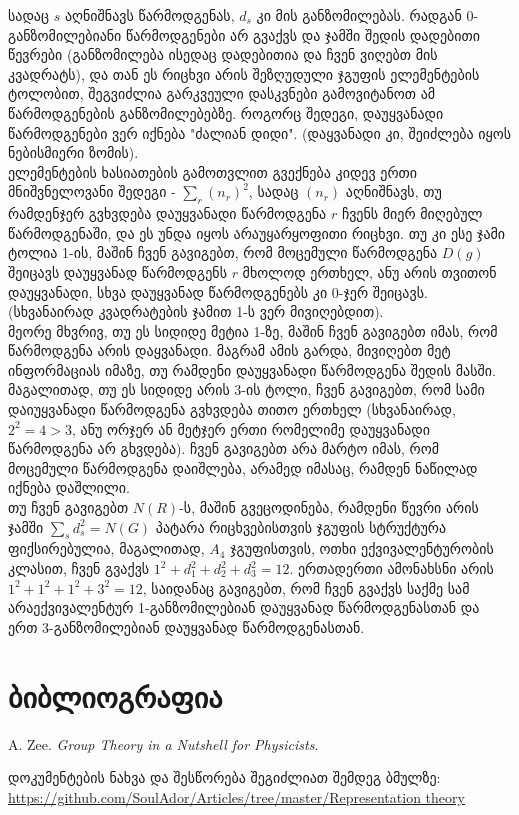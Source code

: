 \documentclass[12pt]{article}
\begin{document}
\begin{sloppypar}
სადაც $s$ აღნიშნავს წარმოდგენას, $d_s$ კი მის განზომილებას. რადგან 0-განზომილებიანი წარმოდგენები არ გვაქვს და ჯამში შედის დადებითი წევრები (განზომილება ისედაც დადებითია და ჩვენ ვიღებთ მის კვადრატს), და თან ეს რიცხვი არის შეზღუდული ჯგუფის ელემენტების ტოლობით, შეგვიძლია გარკვეული დასკვნები გამოვიტანოთ ამ წარმოდგენების განზომილებებზე. როგორც შედეგი, დაუყვანადი წარმოდგენები ვერ იქნება "ძალიან დიდი". (დაყვანადი კი, შეიძლება იყოს ნებისმიერი ზომის).\\

ელემენტების ხასიათების გამოთვლით გვექნება კიდევ ერთი მნიშვნელოვანი შედეგი - 
$ \sum_r (n_r)^2 $, სადაც $(n_r)$ აღნიშნავს, თუ რამდენჯერ გვხვდება დაუყვანადი წარმოდგენა $r$ ჩვენს მიერ მიღებულ წარმოდგენაში, და ეს უნდა იყოს არაუყარყოფითი რიცხვი. თუ კი ესე ჯამი ტოლია 1-ის, მაშინ ჩვენ გავიგებთ, რომ მოცემული წარმოდგენა $D(g)$ შეიცავს დაუყვანად წარმოდგენს $r$ მხოლოდ ერთხელ, ანუ არის თვითონ დაუყვანადი, სხვა დაუყვანად წარმოდგენებს კი 0-ჯერ შეიცავს. (სხვანაირად კვადრატების ჯამით 1-ს ვერ მივიღებდით).\\

მეორე მხვრივ, თუ ეს სიდიდე მეტია 1-ზე, მაშინ ჩვენ გავიგებთ იმას, რომ წარმოდგენა არის დაყვანადი. მაგრამ ამის გარდა, მივიღებთ მეტ ინფორმაციას იმაზე, თუ რამდენი დაუყვანადი წარმოდგენა შედის მასში. მაგალითად, თუ ეს სიდიდე არის 3-ის ტოლი, ჩვენ გავიგებთ, რომ სამი დაიუყვანადი წარმოდგენა გვხვდება თითო ერთხელ (სხვანაირად, $2^2=4>3$, ანუ ორჯერ ან მეტჯერ ერთი რომელიმე დაუყვანადი წარმოდგენა არ გხვდება). ჩვენ გავიგებთ არა მარტო იმას, რომ მოცემული წარმოდგენა დაიშლება, არამედ იმასაც, რამდენ ნაწილად იქნება დაშლილი.\\

თუ ჩვენ გავიგებთ $N(R)$-ს, მაშინ გვეცოდინება, რამდენი წევრი არის ჯამში 
$ \sum_s d^2_s = N(G)$ პატარა რიცხვებისთვის ჯგუფის სტრუქტურა ფიქსირებულია, მაგალითად, $A_4$ ჯგუფისთვის, ოთხი ექვივალენტურობის კლასით, ჩვენ გვაქვს $1^2 + d_1^2 + d_2^2 + d_3^2 = 12$. ერთადერთი ამონახსნი არის $1^2 + 1^2 + 1^2 + 3^2 = 12$, საიდანაც გავიგებთ, რომ ჩვენ გვაქვს საქმე სამ არაექვივალენტურ 1-განზომილებიან დაუყვანად წარმოდგენასთან და ერთ 3-განზომილებიან დაუყვანად წარმოდგენასთან.

\newpage
\section{ბიბლიოგრაფია}
\begin{thebibliography}{9}
A. Zee. 
\textit{Group Theory in a Nutshell for Physicists}.
\end{thebibliography}

დოკუმენტების ნახვა და შესწორება შეგიძლიათ შემდეგ ბმულზე: \\
\href{https://github.com/SoulAdor/Articles/tree/master/Representation theory}{https://github.com/SoulAdor/Articles/tree/master/Representation theory} 

\end{sloppypar}
\end{document}
